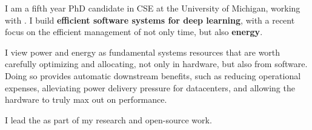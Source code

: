 

\begin{cvparagraph}

I am a fifth year PhD candidate in CSE at the University of Michigan, working with \href{https://mosharaf.com}{}.
I build \textbf{efficient software systems for deep learning}, with a recent focus on the efficient management of not only time, but also \textbf{energy}.

I view power and energy as fundamental systems resources that are worth carefully optimizing and allocating, not only in hardware, but also from software.
Doing so provides automatic downstream benefits, such as reducing operational expenses, alleviating power delivery pressure for datacenters, and allowing the hardware to truly max out on performance.

I lead the \href{https://ml.energy}{} as part of my research and open-source work.
\end{cvparagraph}
